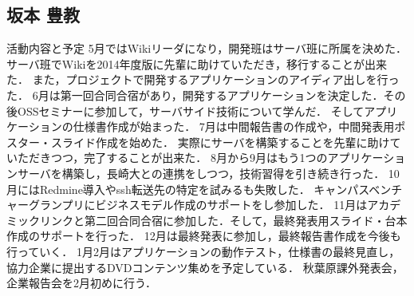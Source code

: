 \subsection{坂本 豊教}
\par
活動内容と予定
5月ではWikiリーダになり，開発班はサーバ班に所属を決めた．サーバ班でWikiを2014年度版に先輩に助けていただき，移行することが出来た．
また，プロジェクトで開発するアプリケーションのアイディア出しを行った．
6月は第一回合同合宿があり，開発するアプリケーションを決定した．その後OSSセミナーに参加して，サーバサイド技術について学んだ．
そしてアプリケーションの仕様書作成が始まった．
7月は中間報告書の作成や，中間発表用ポスター・スライド作成を始めた．
実際にサーバを構築することを先輩に助けていただきつつ，完了することが出来た．
8月から9月はもう1つのアプリケーションサーバを構築し，長崎大との連携をしつつ，技術習得を引き続き行った．
10月にはRedmine導入やssh転送先の特定を試みるも失敗した．
キャンパスベンチャーグランプリにビジネスモデル作成のサポートをし参加した．
11月はアカデミックリンクと第二回合同合宿に参加した．そして，最終発表用スライド・台本作成のサポートを行った．
12月は最終発表に参加し，最終報告書作成を今後も行っていく．
1月2月はアプリケーションの動作テスト，仕様書の最終見直し，協力企業に提出するDVDコンテンツ集めを予定している．
秋葉原課外発表会，企業報告会を2月初めに行う．

